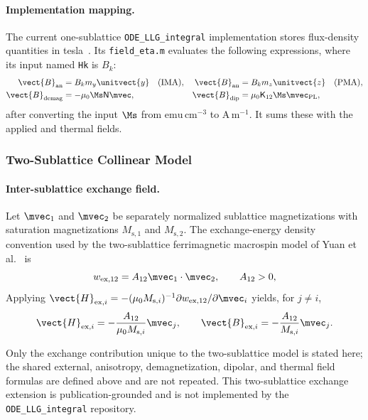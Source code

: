 \paragraph{Implementation mapping.}
The current one-sublattice \texttt{ODE\_LLG\_integral} implementation stores
flux-density quantities in tesla~\cite{ode-llg-code}.  Its
\texttt{field\_eta.m} evaluates the following expressions, where its input
named \texttt{Hk} is $B_k$:
\begin{align*}
    \vect{B}_{\mathrm{an}}
     & =B_k m_y\unitvect{y} \quad\text{(IMA)},
     &
    \vect{B}_{\mathrm{an}}
     & =B_k m_z\unitvect{z} \quad\text{(PMA)},      \\
    \vect{B}_{\mathrm{demag}}
     & =-\mu_0\Ms\mathsf{N}\mvec,
     &
    \vect{B}_{\mathrm{dip}}
     & =\mu_0\mathsf{K}_{12}\Ms\mvec_{\mathrm{PL}},
\end{align*}
after converting the input $\Ms$ from $\mathrm{emu\,cm^{-3}}$ to
$\mathrm{A\,m^{-1}}$.  It sums these with the applied and thermal fields.

\subsubsection{Two-Sublattice Collinear Model}

\paragraph{Inter-sublattice exchange field.}
Let $\mvec_1$ and $\mvec_2$ be separately normalized sublattice
magnetizations with saturation magnetizations $M_{\mathrm{s},1}$ and
$M_{\mathrm{s},2}$.  The exchange-energy density convention used by the
two-sublattice ferrimagnetic macrospin model of Yuan et
al.~\cite{yuan2023thermal} is
\begin{equation}
    w_{\mathrm{ex},12}=A_{12}\mvec_1\cdot\mvec_2,
    \qquad A_{12}>0,
    \label{eq:two-sublattice-exchange-energy}
\end{equation}
Applying
$\vect{H}_{\mathrm{ex},i}=-(\mu_0M_{\mathrm{s},i})^{-1}
    \partial w_{\mathrm{ex},12}/\partial\mvec_i$ yields, for $j\ne i$,
\begin{equation}
    \vect{H}_{\mathrm{ex},i}
    =-\frac{A_{12}}{\mu_0M_{\mathrm{s},i}}\mvec_j,
    \qquad
    \vect{B}_{\mathrm{ex},i}
    =-\frac{A_{12}}{M_{\mathrm{s},i}}\mvec_j.
    \label{eq:two-sublattice-exchange-field}
\end{equation}

Only the exchange contribution unique to the two-sublattice model is stated
here; the shared external, anisotropy, demagnetization, dipolar, and thermal
field formulas are defined above and are not repeated.  This two-sublattice
exchange extension is publication-grounded and is not implemented by the
\texttt{ODE\_LLG\_integral} repository.
